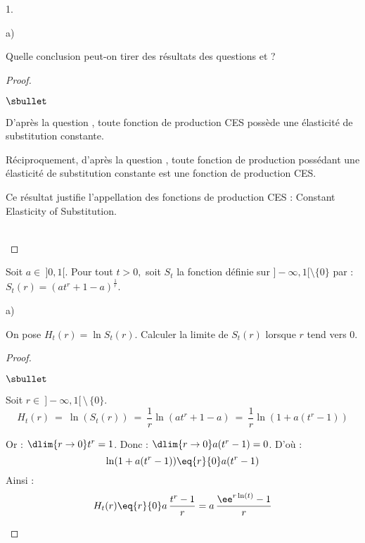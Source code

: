 \begin{noliste}{1.}
\begin{noliste}{a)}
  
  
  
  \newpage
  
  
  

  
  \item Quelle conclusion peut-on tirer des résultats des questions 
   et  ?
  
  \begin{proof}~
   \begin{noliste}{$\sbullet$}
    \item D'après la question , toute fonction de 
    production CES possède une élasticité de substitution constante.
    
    \item Réciproquement, d'après la question , toute
    fonction de production possédant une élasticité de 
    substitution constante est une fonction de production CES.
   \end{noliste}
   
   
   \begin{remark}
    Ce résultat justifie l'appellation des fonctions de production
    CES : Constant Elasticity of Substitution.
   \end{remark}~\\[-1.4cm]
  \end{proof}
 \end{noliste}
 
 \item Soit $a \in \ ]0,1[$. Pour tout $t>0,$ soit $S_t$ la fonction 
 définie sur $]-\infty,1[ \setminus \{0\}$ par : 
 $S_t(r)=(at^r+1-a)^{\frac{1}{r}}$.
 \begin{noliste}{a)}
  \setlength{\itemsep}{2mm}
  \item On pose $H_t(r)=\ln S_t(r)$. Calculer la limite de $S_t(r)$ 
  lorsque $r$ tend vers 0.
  
  \begin{proof}~
   \begin{noliste}{$\sbullet$}
    \item Soit $r\in \ ]-\infty,1[ \, \setminus \, \{0\}$.
    \[
     H_t(r) \ = \ \ln(S_t(r)) \ = \ \dfrac{1}{r} \ln(at^r +1-a)
     \ = \ \dfrac{1}{r} \ln(1+ a(t^r-1))
    \]
    
    \item Or : $\dlim{r\to 0} t^r=1$. Donc : 
    $\dlim{r\to 0} a(t^r-1)=0$. D'où :
    \[
     \ln(1+a(t^r-1)) \eq{r}{0} a(t^r-1)
    \]
    Ainsi :
    \[
     H_t(r) \eq{r}{0} a \, \dfrac{t^r-1}{r} = a \,
     \dfrac{\ee^{r \ln(t)}-1}{r}
    \]
    

\end{noliste}
\end{proof}
\end{noliste}
\end{noliste}
